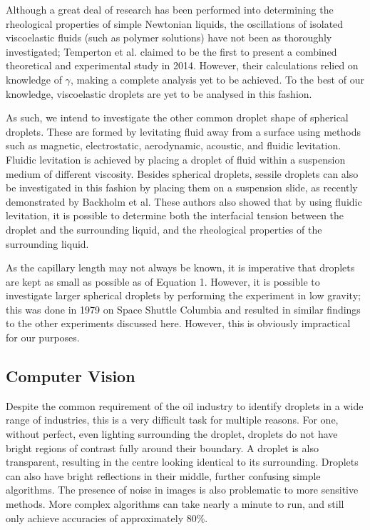 \documentclass{physics_article_B}
\begin{document}
Although a great deal of research has been performed into determining the rheological properties of simple Newtonian liquids, the oscillations of isolated viscoelastic fluids (such as polymer solutions) have not been as thoroughly investigated; Temperton et al. claimed to be the first to present a combined theoretical and experimental study in 2014\cite{temperton}. However, their calculations relied on knowledge of $\gamma$, making a complete analysis yet to be achieved. To the best of our knowledge, viscoelastic droplets are yet to be analysed in this fashion.

As such, we intend to investigate the other common droplet shape of spherical droplets. These are formed by levitating fluid away from a surface using methods such as magnetic\cite{temperton, hill}, electrostatic\cite{mugele, wong}, aerodynamic\cite{benmore}, acoustic\cite{Temperton2012, Yarin1998}, and fluidic levitation. Fluidic levitation is achieved by placing a droplet of fluid within a suspension medium of different viscosity. Besides spherical droplets, sessile droplets can also be investigated in this fashion by placing them on a suspension slide, as recently demonstrated by Backholm et al\cite{Backholm2017}. These authors also showed that\cite{Backholm2017} by using fluidic levitation, it is possible to determine both the interfacial tension between the droplet and the surrounding liquid, and the rheological properties of the surrounding liquid.

As the capillary length may not always be known, it is imperative that droplets are kept as small as possible as of Equation 1. However, it is possible to investigate larger spherical droplets by performing the experiment in low gravity; this was done in 1979\cite{holt} on Space Shuttle Columbia and resulted in similar findings to the other experiments discussed here. However, this is obviously impractical for our purposes.

\subsection{Computer Vision}

Despite the common requirement of the oil industry to identify droplets in a wide range of industries\cite{bubblegeneral}, this is a very difficult task for multiple reasons. For one, without perfect, even lighting surrounding the droplet, droplets do not have bright regions of contrast fully around their boundary. A droplet is also transparent, resulting in the centre looking identical to its surrounding. Droplets can also have bright reflections in their middle, further confusing simple algorithms\cite{bubble1}. The presence of noise in images is also problematic to more sensitive methods. More complex algorithms can take nearly a minute to run\cite{bubble2}, and still only achieve accuracies of approximately 80\%\cite{bubble2}.
\end{document}

